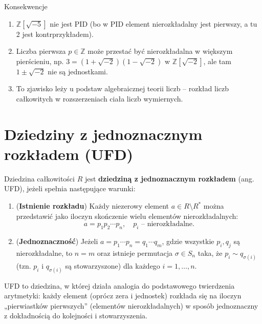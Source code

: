 \begin{remark}
Konsekwencje
\begin{enumerate}[label=\arabic*)]
    \item $\mathbb{Z}[\sqrt{-5}]$ nie jest PID (bo w PID element nierozkładalny jest pierwszy, a tu 2 jest kontrprzykładem).
    \item Liczba pierwsza $p \in \mathbb{Z}$ może przestać być nierozkładalna w większym pierścieniu, np. $3 = (1+\sqrt{-2})(1-\sqrt{-2})$ w $\mathbb{Z}[\sqrt{-2}]$, ale tam $1\pm\sqrt{-2}$ nie są jednostkami.
    \item To zjawisko leży u podstaw algebraicznej teorii liczb – rozkład liczb całkowitych w rozszerzeniach ciała liczb wymiernych.
\end{enumerate}
\end{remark}

\section{Dziedziny z jednoznacznym rozkładem (UFD)}

\begin{definition}
Dziedzina całkowitości $R$ jest \textbf{dziedziną z jednoznacznym rozkładem} (ang. UFD), jeżeli spełnia następujące warunki:
\begin{enumerate}[label=\arabic*)]
    \item (\textbf{Istnienie rozkładu}) Każdy niezerowy element $a \in R \setminus R^*$ można przedstawić jako iloczyn skończenie wielu elementów nierozkładalnych:
    \[
    a = p_1 p_2 \cdots p_n, \quad p_i \text{ – nierozkładalne}.
    \]
    \item (\textbf{Jednoznaczność}) Jeżeli $a = p_1 \cdots p_n = q_1 \cdots q_m$, gdzie wszystkie $p_i, q_j$ są nierozkładalne, to $n = m$ oraz istnieje permutacja $\sigma \in S_n$ taka, że $p_i \sim q_{\sigma(i)}$ (tzn. $p_i$ i $q_{\sigma(i)}$ są stowarzyszone) dla każdego $i=1,\dots,n$.
\end{enumerate}
\end{definition}

\begin{intuition}
UFD to dziedzina, w której działa analogia do podstawowego twierdzenia arytmetyki: każdy element (oprócz zera i jednostek) rozkłada się na iloczyn „pierwiastków pierwszych” (elementów nierozkładalnych) w sposób jednoznaczny z dokładnością do kolejności i stowarzyszenia.
\end{intuition}

